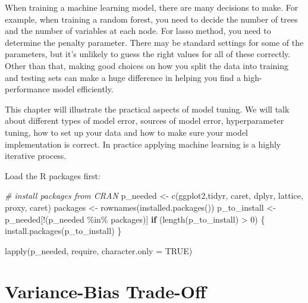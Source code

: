 \documentclass[
  12pt,
]{krantz}
\makeatletter
\newenvironment{Shaded}{\begin{snugshade}}{\end{snugshade}}
\newcommand{\AttributeTok}[1]{\textcolor[rgb]{0.61,0.61,0.61}{#1}}
\newcommand{\CommentTok}[1]{\textcolor[rgb]{0.37,0.37,0.37}{\textit{#1}}}
\newcommand{\ConstantTok}[1]{\textcolor[rgb]{0,0,0}{#1}}
\newcommand{\ControlFlowTok}[1]{\textcolor[rgb]{0.27,0.27,0.27}{\textbf{#1}}}
\newcommand{\DecValTok}[1]{\textcolor[rgb]{0.06,0.06,0.06}{#1}}
\newcommand{\FunctionTok}[1]{\textcolor[rgb]{0,0,0}{#1}}
\newcommand{\NormalTok}[1]{#1}
\newcommand{\OtherTok}[1]{\textcolor[rgb]{0.37,0.37,0.37}{#1}}
\newcommand{\SpecialCharTok}[1]{\textcolor[rgb]{0,0,0}{#1}}
\newcommand{\StringTok}[1]{\textcolor[rgb]{0.5,0.5,0.5}{#1}}
\newenvironment{kframe}{%
\medskip{}
\setlength{\fboxsep}{.8em}
 \def\at@end@of@kframe{}%
 \ifinner\ifhmode%
  \def\at@end@of@kframe{\end{minipage}}%
  \begin{minipage}{\columnwidth}%
 \fi\fi%
 \def\FrameCommand##1{\hskip\@totalleftmargin \hskip-\fboxsep
 \colorbox{shadecolor}{##1}\hskip-\fboxsep
     \hskip-\linewidth \hskip-\@totalleftmargin \hskip\columnwidth}%
 \MakeFramed {\advance\hsize-\width
   \@totalleftmargin\z@ \linewidth\hsize
   \@setminipage}}%
 {\par\unskip\endMakeFramed%
 \at@end@of@kframe}
\renewenvironment{Shaded}{\begin{kframe}}{\end{kframe}}
\makeatother
\begin{document}
When training a machine learning model, there are many decisions to make. For example, when training a random forest, you need to decide the number of trees and the number of variables at each node. For lasso method, you need to determine the penalty parameter. There may be standard settings for some of the parameters, but it's unlikely to guess the right values for all of these correctly. Other than that, making good choices on how you split the data into training and testing sets can make a huge difference in helping you find a high-performance model efficiently.

This chapter will illustrate the practical aspects of model tuning. We will talk about different types of model error, sources of model error, hyperparameter tuning, how to set up your data and how to make sure your model implementation is correct. In practice applying machine learning is a highly iterative process.

Load the R packages first:

\begin{Shaded}
\begin{Highlighting}[]
\CommentTok{\# install packages from CRAN}
\NormalTok{p\_needed }\OtherTok{\textless{}{-}} \FunctionTok{c}\NormalTok{(}\StringTok{\textquotesingle{}ggplot2\textquotesingle{}}\NormalTok{,}\StringTok{\textquotesingle{}tidyr\textquotesingle{}}\NormalTok{, }\StringTok{\textquotesingle{}caret\textquotesingle{}}\NormalTok{, }\StringTok{\textquotesingle{}dplyr\textquotesingle{}}\NormalTok{, }
              \StringTok{\textquotesingle{}lattice\textquotesingle{}}\NormalTok{, }\StringTok{\textquotesingle{}proxy\textquotesingle{}}\NormalTok{, }\StringTok{\textquotesingle{}caret\textquotesingle{}}\NormalTok{)}
\NormalTok{packages }\OtherTok{\textless{}{-}} \FunctionTok{rownames}\NormalTok{(}\FunctionTok{installed.packages}\NormalTok{())}
\NormalTok{p\_to\_install }\OtherTok{\textless{}{-}}\NormalTok{ p\_needed[}\SpecialCharTok{!}\NormalTok{(p\_needed }\SpecialCharTok{\%in\%}\NormalTok{ packages)]}
\ControlFlowTok{if}\NormalTok{ (}\FunctionTok{length}\NormalTok{(p\_to\_install) }\SpecialCharTok{\textgreater{}} \DecValTok{0}\NormalTok{) \{}
    \FunctionTok{install.packages}\NormalTok{(p\_to\_install)}
\NormalTok{\}}

\FunctionTok{lapply}\NormalTok{(p\_needed, require, }\AttributeTok{character.only =} \ConstantTok{TRUE}\NormalTok{)}
\end{Highlighting}
\end{Shaded}

\hypertarget{vbtradeoff}{%
\section{Variance-Bias Trade-Off}\label{vbtradeoff}}
\end{document}
